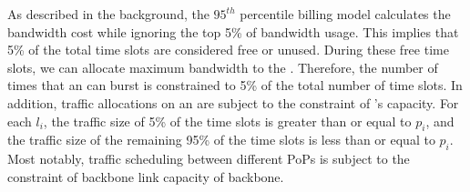 As described in the background, the $95^{th}$ percentile billing model calculates the bandwidth cost while ignoring the top 5\% of bandwidth usage. This implies that 5\% of the total time slots are considered free or unused. During these free time slots, we can allocate maximum bandwidth to the {\egress}. Therefore, the number of times that an {\egress} can burst is constrained to 5\% of the total number of time slots. In addition, traffic allocations on an {\egress} are subject to the constraint of {\egress}'s capacity. For each {\egress} $l_i$, the traffic size of 5\% of the time slots is greater than or equal to $p_i$, and the traffic size of the remaining 95\% of the time slots is less than or equal to $p_i$. Most notably, traffic scheduling between different PoPs is subject to the constraint of backbone link capacity of backbone.




